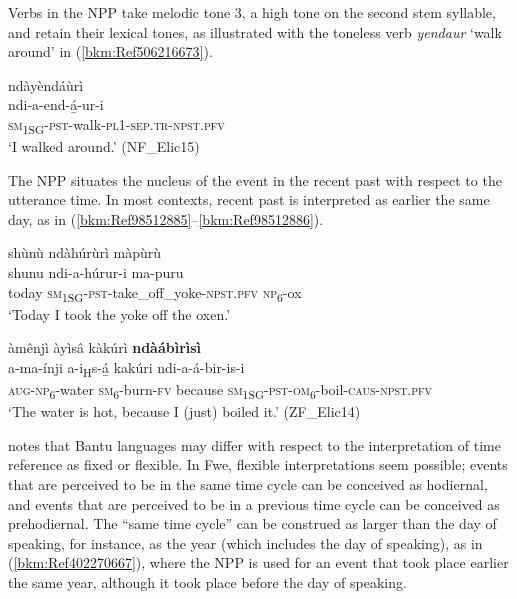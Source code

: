 Verbs in the NPP take melodic tone 3, a high tone on the second stem syllable, and retain their lexical tones, as illustrated with the toneless verb \textit{yendaur} ‘walk around’ in (\ref{bkm:Ref506216673}).

\ea
\label{bkm:Ref506216673}
\glll ndàyèndáùrì\\
ndi-a-end-á̲-ur-i\\
\textsc{sm}\textsubscript{1SG}-\textsc{pst}-walk-\textsc{pl}1-\textsc{sep}.\textsc{tr}-\textsc{npst}.\textsc{pfv}\\
\glt ‘I walked around.’ (NF\_Elic15)
\z

The NPP situates the nucleus of the event in the recent past with respect to the utterance time. In most contexts, recent past is interpreted as earlier the same day, as in (\ref{bkm:Ref98512885}--\ref{bkm:Ref98512886}).

\ea
\label{bkm:Ref98512885}
shùnù ndàhúrùrì màpùrù\\
\gll shunu  ndi-a-húrur-i        ma-puru\\
today  \textsc{sm}\textsubscript{1SG}-\textsc{pst}-take\_off\_yoke-\textsc{npst}.\textsc{pfv}  \textsc{np}\textsubscript{6}-ox\\
\glt ‘Today I took the yoke off the oxen.’
\z

\ea
\label{bkm:Ref98512886}
àmênjì àyìsâ kàkúrì \textbf{ndàábìrìsì}\\
\gll a-ma-ínji    a-i\textsubscript{H}s-á̲ kakúri    ndi-a-á-bir-is-i \\
\textsc{aug}-\textsc{np}\textsubscript{6}-water  \textsc{sm}\textsubscript{6}-burn-\textsc{fv}
because  \textsc{sm}\textsubscript{1SG}-\textsc{pst}-\textsc{om}\textsubscript{6}-boil-\textsc{caus}-\textsc{npst}.\textsc{pfv}\\
\glt ‘The water is hot, because I (just) boiled it.’ (ZF\_Elic14)
\z

{\citet[93]{Nurse2008}} notes that Bantu languages may differ with respect to the interpretation of time reference as fixed or flexible. In Fwe, flexible interpretations seem possible; events that are perceived to be in the same time cycle can be conceived as hodiernal, and events that are perceived to be in a previous time cycle can be conceived as prehodiernal. The “same time cycle” can be construed as larger than the day of speaking, for instance, as the year (which includes the day of speaking), as in (\ref{bkm:Ref402270667}), where the NPP is used for an event that took place earlier the same year, although it took place before the day of speaking.

